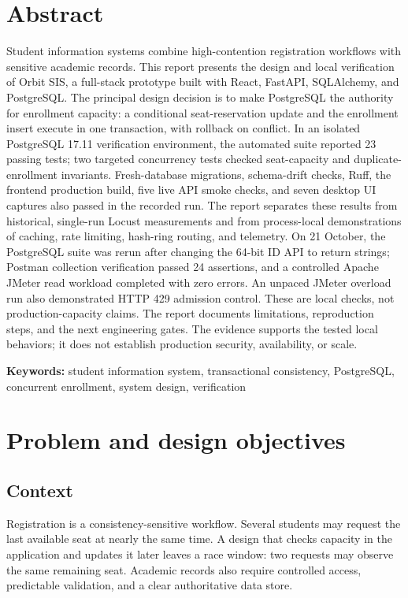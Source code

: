 \documentclass[11pt,a4paper,oneside]{report}
\begin{document}
\chapter*{Abstract}
Student information systems combine high-contention registration workflows with sensitive academic records. This report presents the design and local verification of Orbit SIS, a full-stack prototype built with React, FastAPI, SQLAlchemy, and PostgreSQL. The principal design decision is to make PostgreSQL the authority for enrollment capacity: a conditional seat-reservation update and the enrollment insert execute in one transaction, with rollback on conflict. In an isolated PostgreSQL 17.11 verification environment, the automated suite reported 23 passing tests; two targeted concurrency tests checked seat-capacity and duplicate-enrollment invariants. Fresh-database migrations, schema-drift checks, Ruff, the frontend production build, five live API smoke checks, and seven desktop UI captures also passed in the recorded run. The report separates these results from historical, single-run Locust measurements and from process-local demonstrations of caching, rate limiting, hash-ring routing, and telemetry. On 21 October, the PostgreSQL suite was rerun after changing the 64-bit ID API to return strings; Postman collection verification passed 24 assertions, and a controlled Apache JMeter read workload completed with zero errors. An unpaced JMeter overload run also demonstrated HTTP 429 admission control. These are local checks, not production-capacity claims. The report documents limitations, reproduction steps, and the next engineering gates. The evidence supports the tested local behaviors; it does not establish production security, availability, or scale.

\textbf{Keywords:} student information system, transactional consistency, PostgreSQL, concurrent enrollment, system design, verification
\clearpage
\tableofcontents
\clearpage
\listoffigures
\clearpage
\listoftables
\clearpage
\hypersetup{pageanchor=true}

\chapter{Problem and design objectives}
\section{Context}
Registration is a consistency-sensitive workflow. Several students may request the last available seat at nearly the same time. A design that checks capacity in the application and updates it later leaves a race window: two requests may observe the same remaining seat. Academic records also require controlled access, predictable validation, and a clear authoritative data store.
\end{document}
